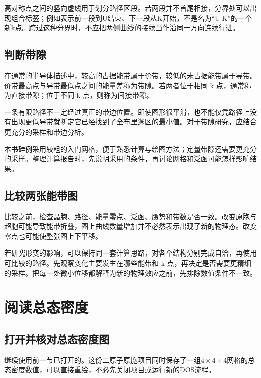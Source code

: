 高对称点之间的竖向虚线用于划分路径区段。若两段并不首尾相接，分界处可以出现组合标签；例如表示前一段到U结束、下一段从K开始，不是名为“U|K”的一个新k点。跨过这种分界时，不应把两侧曲线的接续当作沿同一方向连续行进。

\subsection{判断带隙}

在通常的半导体描述中，较高的占据能带属于价带，较低的未占据能带属于导带。价带最高点与导带最低点之间的能量差称为带隙。若两者位于相同 k 点，通常称为直接带隙；位于不同 k 点，则称为间接带隙。

一条有限路径不一定经过真正的带边位置。即使图形很平滑，也不能仅凭路径上没有出现更低导带就断定它已经找到了全布里渊区的最小值。对于带隙研究，应结合更充分的采样和带边分析。

本书硅例采用较粗的入门网格，便于熟悉计算与绘图方法；定量带隙还需要更充分的采样。整理计算报告时，先说明采用的条件，再讨论网格和泛函可能怎样影响结果。

\subsection{比较两张能带图}

比较之前，检查晶胞、路径、能量零点、泛函、赝势和带数是否一致。改变原胞与超胞可能导致能带折叠，图上曲线数量增加并不必然表示出现了新的物理态。改变零点也可能使整张图上下平移。

若研究形变的影响，可以保持同一套计算思路，对各个结构分别完成自洽，再使用可比较的路径。先观察变化主要发生在哪些能带和 k 点，再决定是否需要更精细的采样。把每一处微小位移都解释为新的物理效应之前，先排除数值条件不一致。

\section{阅读总态密度}

\subsection{打开并核对总态密度图}

继续使用前一节已打开的。这份二原子原胞项目同时保存了一组$4\times4\times4$网格的总态密度数值，可以直接重绘，不必先关闭项目或运行新的DOS流程。

